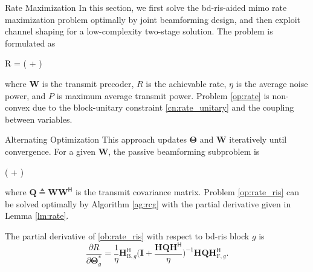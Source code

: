 \documentclass[journal]{IEEEtran}
\begin{document}
\begin{section}{Rate Maximization}
	\label{sc:rate}
	In this section, we first solve the \gls{bd}-\gls{ris}-aided \gls{mimo} rate maximization problem optimally by joint beamforming design, and then exploit channel shaping for a low-complexity two-stage solution.
	The problem is formulated as
	\begin{maxi!}
		{}{R = \log \det \biggl( + \biggr)}{\label{op:rate}}{\label{ob:rate}}
	\end{maxi!}
	where $\mathbf{W}$ is the transmit precoder, $R$ is the achievable rate, $\eta$ is the average noise power, and $P$ is maximum average transmit power.
	Problem \eqref{op:rate} is non-convex due to the block-unitary constraint \eqref{cn:rate_unitary} and the coupling between variables.

	\begin{subsection}{Alternating Optimization}
		\label{sc:rate_ao}
		This approach updates $\mathbf{\Theta}$ and $\mathbf{W}$ iteratively until convergence.
		For a given $\mathbf{W}$, the passive beamforming subproblem is
		\begin{maxi!}
			{\scriptstyle{\mathbf{\Theta}}}{\log \det \biggl( + \biggr)}{\label{op:rate_ris}}{\label{ob:rate_ris}}
			\addConstraint{\mathbf{\Theta}_g^\mathsf{H} \mathbf{\Theta}_g=\mathbf{I}, \quad \forall g,}{}{}
		\end{maxi!}
		where $\mathbf{Q} \triangleq \mathbf{W} \mathbf{W}^\mathsf{H}$ is the transmit covariance matrix.
		Problem \eqref{op:rate_ris} can be solved optimally by Algorithm \ref{ag:rcg} with the partial derivative given in Lemma \ref{lm:rate}.
		\begin{lemma}
			\label{lm:rate}
			The partial derivative of \eqref{ob:rate_ris} with respect to \gls{bd}-\gls{ris} block $g$ is
			\begin{equation}
				\label{eq:gradient_eucl_rate}
				\frac{\partial R}{\partial \mathbf{\Theta}_g^*} = \frac{1}{\eta} \mathbf{H}_{\mathrm{B},g}^\mathsf{H} \biggl(\mathbf{I} + \frac{\mathbf{H}\mathbf{Q}\mathbf{H}^\mathsf{H}}{\eta}\biggr)^{-1} \mathbf{H} \mathbf{Q} \mathbf{H}_{\mathrm{F},g}^\mathsf{H}.
			\end{equation}
		\end{lemma}


\end{subsection}
\end{section}
\end{document}

